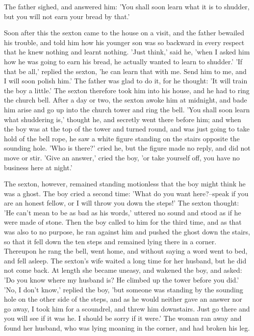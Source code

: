\documentclass[12pt]{book}
\begin{document}
The father sighed, and answered him: 'You shall soon learn what it is
to shudder, but you will not earn your bread by that.'

Soon after this the sexton came to the house on a visit, and the
father bewailed his trouble, and told him how his younger son was so
backward in every respect that he knew nothing and learnt nothing.
'Just think,' said he, 'when I asked him how he was going to earn his
bread, he actually wanted to learn to shudder.' 'If that be all,'
replied the sexton, 'he can learn that with me. Send him to me, and I
will soon polish him.' The father was glad to do it, for he thought:
'It will train the boy a little.' The sexton therefore took him into
his house, and he had to ring the church bell. After a day or two, the
sexton awoke him at midnight, and bade him arise and go up into the
church tower and ring the bell. 'You shall soon learn what shuddering
is,' thought he, and secretly went there before him; and when the boy
was at the top of the tower and turned round, and was just going to
take hold of the bell rope, he saw a white figure standing on the
stairs opposite the sounding hole. 'Who is there?' cried he, but the
figure made no reply, and did not move or stir. 'Give an answer,'
cried the boy, 'or take yourself off, you have no business here at
night.'

The sexton, however, remained standing motionless that the boy might
think he was a ghost. The boy cried a second time: 'What do you want
here?--speak if you are an honest fellow, or I will throw you down the
steps!' The sexton thought: 'He can't mean to be as bad as his words,'
uttered no sound and stood as if he were made of stone. Then the boy
called to him for the third time, and as that was also to no purpose,
he ran against him and pushed the ghost down the stairs, so that it
fell down the ten steps and remained lying there in a corner.
Thereupon he rang the bell, went home, and without saying a word went
to bed, and fell asleep. The sexton's wife waited a long time for her
husband, but he did not come back. At length she became uneasy, and
wakened the boy, and asked: 'Do you know where my husband is? He
climbed up the tower before you did.' 'No, I don't know,' replied the
boy, 'but someone was standing by the sounding hole on the other side
of the steps, and as he would neither gave an answer nor go away, I
took him for a scoundrel, and threw him downstairs. Just go there and
you will see if it was he. I should be sorry if it were.' The woman
ran away and found her husband, who was lying moaning in the corner,
and had broken his leg.
\end{document}
